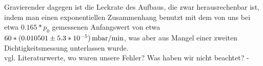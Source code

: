 \documentclass[]{article}
\begin{document}
Gravierender dagegen ist die Leckrate des Aufbaus, die zwar herausrechenbar ist, indem man einen exponentiellen Zusammenhang benutzt mit dem von uns bei etwa $0.165*p_0$ gemessenen Anfangswert von etwa $60*(0.010501 \pm 5.3*10^{-5})\SI{}{ \, \milli \bar /{\minute}}$, was aber aus Mangel einer zweiten Dichtigkeitsmessung unterlassen wurde. \\
{\color{red}vgl. Literaturwerte, wo waren unsere Fehler? Was haben wir nicht beachtet? - }
\end{document}
